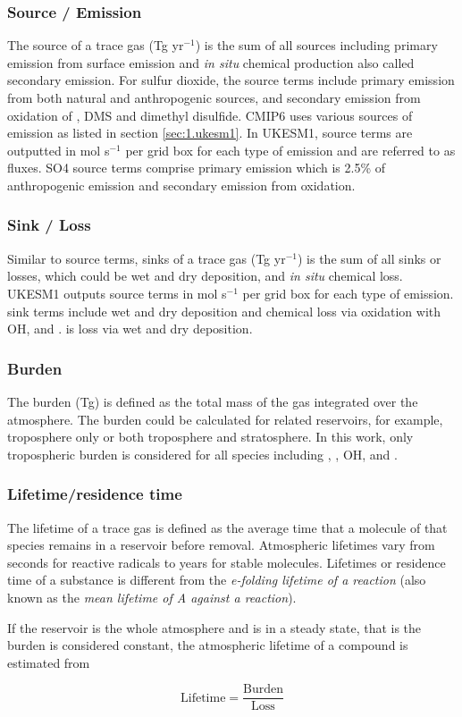 \subsubsection{Source / Emission}

The source of a trace gas (Tg yr$^{-1}$) is the sum of all sources including primary emission from surface emission and \textit{in situ} chemical production also called secondary emission. For sulfur dioxide, the source terms include primary emission from both natural and anthropogenic sources, and secondary emission from oxidation of , DMS and dimethyl disulfide. CMIP6 uses various sources of  emission as listed in section \ref{sec:1.ukesm1}. In UKESM1, source terms are outputted in mol s$^{-1}$ per grid box for each type of emission and are referred to as fluxes. SO4 source terms comprise primary emission which is 2.5\% of anthropogenic  emission and secondary emission from  oxidation.

\subsubsection{Sink / Loss}

Similar to source terms, sinks of a trace gas (Tg yr$^{-1}$) is the sum of all sinks or losses, which could be wet and dry deposition, and \textit{in situ} chemical loss. UKESM1 outputs source terms in mol s$^{-1}$ per grid box for each type of emission.  sink terms include wet and dry deposition and chemical loss via oxidation with OH,  and .  is loss via wet and dry deposition.

\subsubsection{Burden}

The burden (Tg) is defined as the total mass of the gas integrated over the atmosphere. The burden could be calculated for related reservoirs, for example, troposphere only or both troposphere and stratosphere. In this work, only tropospheric burden is considered for all species including , , OH,  and .

\subsubsection{Lifetime/residence time}

The lifetime of a trace gas is defined as the average time that a molecule of that species remains in a reservoir before removal. Atmospheric lifetimes vary from seconds for reactive radicals to years for stable molecules. Lifetimes or residence time of a substance is different from the \textit{e-folding lifetime of a reaction} (also known as the \textit{mean lifetime of A against a reaction}). 

If the reservoir is the whole atmosphere and is in a steady state, that is the burden is considered constant,  the atmospheric lifetime of a compound is estimated from 

\begin{equation}
\label{eq:lifetime}
 \text{Lifetime} = \frac{\text{Burden}}{\text{Loss}}    
\end{equation}
